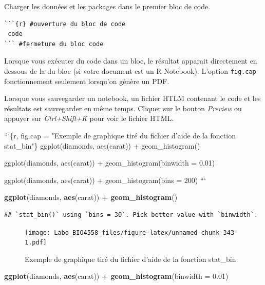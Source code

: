 \documentclass[12pt,]{book}
\newenvironment{Shaded}{\begin{snugshade}}{\end{snugshade}}
\newcommand{\BaseNTok}[1]{\textcolor[rgb]{0.00,0.00,0.81}{#1}}
\newcommand{\DataTypeTok}[1]{\textcolor[rgb]{0.13,0.29,0.53}{#1}}
\newcommand{\FloatTok}[1]{\textcolor[rgb]{0.00,0.00,0.81}{#1}}
\newcommand{\KeywordTok}[1]{\textcolor[rgb]{0.13,0.29,0.53}{\textbf{#1}}}
\newcommand{\NormalTok}[1]{#1}
\newcommand{\OperatorTok}[1]{\textcolor[rgb]{0.81,0.36,0.00}{\textbf{#1}}}
\newcommand{\StringTok}[1]{\textcolor[rgb]{0.31,0.60,0.02}{#1}}
\begin{document}
Charger les données et les packages dans le premier bloc de code.

\begin{verbatim}
```{r} #ouverture du bloc de code
 code
``` #fermeture du bloc code
\end{verbatim}

Lorsque vous exécuter du code dans un bloc, le résultat apparait directement en dessous de la du bloc (si votre document est un R Notebook).
L'option \texttt{fig.cap} fonctionnement seulement lorsqu'on génère un PDF.

Lorsque vous sauvegarder un notebook, un fichier HTLM contenant le code et les résultats est sauvegarder en même temps. Cliquer sur le bouton \emph{Preview} ou appuyer sur \emph{Ctrl+Shift+K} pour voir le fichier HTML.

\begin{Shaded}
\begin{Highlighting}[]
\BaseNTok{```\{r, fig.cap = "Exemple de graphique tiré du fichier d'aide de la fonction stat_bin"\}}
\BaseNTok{ggplot(diamonds, aes(carat)) +}
\BaseNTok{  geom_histogram()}

\BaseNTok{ggplot(diamonds, aes(carat)) +}
\BaseNTok{  geom_histogram(binwidth = 0.01)}

\BaseNTok{ggplot(diamonds, aes(carat)) +}
\BaseNTok{  geom_histogram(bins = 200)}
\BaseNTok{```}
\end{Highlighting}
\end{Shaded}

\begin{Shaded}
\begin{Highlighting}[]
\KeywordTok{ggplot}\NormalTok{(diamonds, }\KeywordTok{aes}\NormalTok{(carat)) }\OperatorTok{+}
\StringTok{  }\KeywordTok{geom_histogram}\NormalTok{()}
\end{Highlighting}
\end{Shaded}

\begin{verbatim}
## `stat_bin()` using `bins = 30`. Pick better value with `binwidth`.
\end{verbatim}

\begin{figure}
\centering
\texttt{[image: Labo\_BIO4558\_files/figure-latex/unnamed-chunk-343-1.pdf]}
\caption{\label{fig:unnamed-chunk-343-1}Exemple de graphique tiré du fichier d'aide de la fonction stat\_bin}
\end{figure}

\begin{Shaded}
\begin{Highlighting}[]
\KeywordTok{ggplot}\NormalTok{(diamonds, }\KeywordTok{aes}\NormalTok{(carat)) }\OperatorTok{+}
\StringTok{  }\KeywordTok{geom_histogram}\NormalTok{(}\DataTypeTok{binwidth =} \FloatTok{0.01}\NormalTok{)}
\end{Highlighting}
\end{Shaded}
\end{document}
